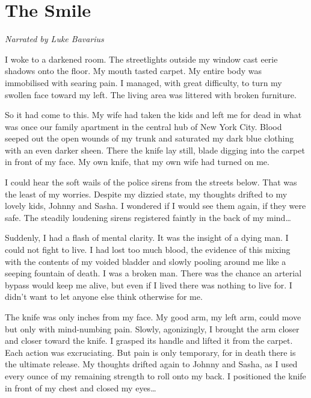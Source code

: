 \chapter{The Smile}



{\em Narrated by Luke Bavarius}



I woke to a darkened room. The streetlights outside my window cast
eerie shadows onto the floor. My mouth tasted carpet. My entire
body was immobilised with searing pain. I managed, with great
difficulty, to turn my swollen face toward my left. The living area
was littered with broken furniture.



So it had come to this. My wife had taken the kids and left me for
dead in what was once our family apartment in the central hub of
New York City. Blood seeped out the open wounds of my trunk and
saturated my dark blue clothing with an even darker sheen. There
the knife lay still, blade digging into the carpet in front of my
face. My own knife, that my own wife had turned on me.



I could hear the soft wails of the police sirens from the streets
below. That was the least of my worries. Despite my dizzied state,
my thoughts drifted to my lovely kids, Johnny and Sasha. I wondered
if I would see them again, if they were safe. The steadily
loudening sirens registered faintly in the back of my mind{\ldots}



Suddenly, I had a flash of mental clarity. It was the insight of a
dying man. I could not fight to live. I had lost too much blood,
the evidence of this mixing with the contents of my voided bladder
and slowly pooling around me like a seeping fountain of death. I
was a broken man. There was the chance an arterial bypass would
keep me alive, but even if I lived there was nothing to live for. I
didn't want to let anyone else think otherwise for me.



The knife was only inches from my face. My good arm, my left arm,
could move but only with mind-numbing pain. Slowly, agonizingly, I
brought the arm closer and closer toward the knife. I grasped its
handle and lifted it from the carpet. Each action was excruciating.
But pain is only temporary, for in death there is the ultimate
release. My thoughts drifted again to Johnny and Sasha, as I used
every ounce of my remaining strength to roll onto my back. I
positioned the knife in front of my chest and closed my
eyes{\ldots}




